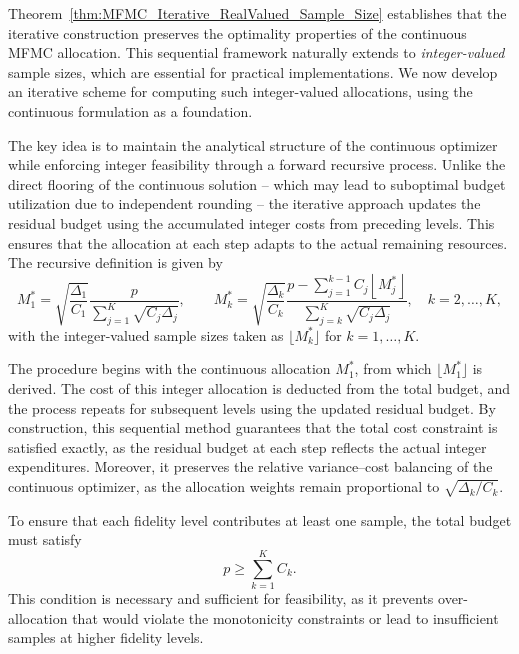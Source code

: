 Theorem~\ref{thm:MFMC_Iterative_RealValued_Sample_Size} establishes that the iterative construction preserves the optimality properties of the continuous MFMC allocation. This sequential framework naturally extends to {\it integer-valued} sample sizes, which are essential for practical implementations. We now develop an iterative scheme for computing such integer-valued allocations, using the continuous formulation as a foundation.

The key idea is to maintain the analytical structure of the continuous optimizer while enforcing integer feasibility through a forward recursive process. Unlike the direct flooring of the continuous solution -- which may lead to suboptimal budget utilization due to independent rounding -- the iterative approach updates the residual budget using the accumulated integer costs from preceding levels. This ensures that the allocation at each step adapts to the actual remaining resources. The recursive definition is given by
%
\begin{equation}\label{eq:MFMC_New_IntegerValued_Sample_Size}
    M_1^* = \sqrt{\frac{\Delta_1}{C_1}}\frac{p}{\sum_{j=1}^K\sqrt{C_j\Delta_j}}, 
    \qquad 
    M_k^* = \sqrt{\frac{\Delta_k}{C_k}}\frac{p-\sum_{j=1}^{k-1}C_j\left\lfloor M_j^* \right\rfloor}{\sum_{j=k}^K\sqrt{C_j\Delta_j}}, 
    \quad k = 2,\ldots, K,
\end{equation}
%
with the integer-valued sample sizes taken as $\lfloor M_k^* \rfloor$ for $k=1,\ldots,K$.

The procedure begins with the continuous allocation $M_1^*$, from which $\lfloor M_1^* \rfloor$ is derived. The cost of this integer allocation is deducted from the total budget, and the process repeats for subsequent levels using the updated residual budget. By construction, this sequential method guarantees that the total cost constraint is satisfied exactly, as the residual budget at each step reflects the actual integer expenditures. Moreover, it preserves the relative variance–cost balancing of the continuous optimizer, as the allocation weights remain proportional to $\sqrt{\Delta_k/C_k}$.


To ensure that each fidelity level contributes at least one sample, the total budget must satisfy
%
\begin{equation}\label{eq:p_bound}
    p \ge \sum_{k=1}^K C_k.
\end{equation}
%
This condition is necessary and sufficient for feasibility, as it prevents over-allocation that would violate the monotonicity constraints or lead to insufficient samples at higher fidelity levels.

